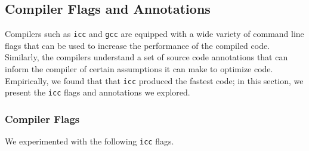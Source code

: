 \newcommand{\ttt}[1]{\texttt{#1}}
\newcommand{\icc}{\texttt{icc}}
\newcommand{\gcc}{\texttt{gcc}}

\subsection{Compiler Flags and Annotations}
Compilers such as \icc{} and \gcc{} are equipped with a wide variety of command
line flags that can be used to increase the performance of the compiled code.
Similarly, the compilers understand a set of source code annotations that can
inform the compiler of certain assumptions it can make to optimize code.
Empirically, we found that that \icc{} produced the fastest code; in this
section, we present the \icc{} flags and annotations we explored.

\subsubsection{Compiler Flags}
We experimented with the following \icc{} flags.

